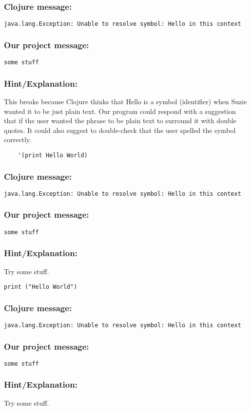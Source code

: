 \documentclass[12pt]{article}
\begin{document}
{\addtolength{\leftskip}{10mm}
\subsubsection*{Clojure message:}
\verb|java.lang.Exception: Unable to resolve symbol: Hello in this context|

\subsubsection*{Our project message:}
\verb|some stuff|
\subsubsection*{Hint/Explanation:}

This breaks because Clojure thinks that Hello is a symbol (identifier) when Suzie wanted it to be just plain text. Our program could respond with a suggestion that if the user wanted the phrase to be plain text to surround it with double quotes. It could also suggest to double-check that the user spelled the symbol correctly.

}

\begin{verbatim}
	'(print Hello World)
\end{verbatim}

{\addtolength{\leftskip}{10mm}
\subsubsection*{Clojure message:}
\verb|java.lang.Exception: Unable to resolve symbol: Hello in this context|

\subsubsection*{Our project message:}
\verb|some stuff|
\subsubsection*{Hint/Explanation:}

Try some stuff.

}

\verb|print ("Hello World")|

{\addtolength{\leftskip}{10mm}
\subsubsection*{Clojure message:}
\verb|java.lang.Exception: Unable to resolve symbol: Hello in this context|

\subsubsection*{Our project message:}
\verb|some stuff|
\subsubsection*{Hint/Explanation:}

Try some stuff.

}
\end{document}
